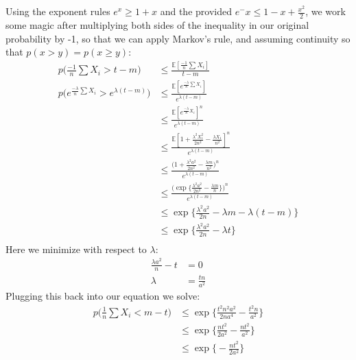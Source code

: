 \documentclass[a4paper,12pt]{article}
\begin{document}
\section{}
Using the exponent rules $e^x \geq 1 + x$ and the provided $e^-x \leq 1 - x + \frac{x^2}{2}$, we work some magic after multiplying both sides of the inequality in our original probability by -1, so that we can apply Markov's rule, and assuming continuity so that $p(x > y) = p(x \geq y)$:
\begin{align*}
p\bigg( \frac{-1}{n} \sum X_i > t - m \bigg) &\leq \frac{ \mathbb{E}[ \frac{-1}{n} \sum X_i] }{t-m} \\
p\bigg( e^{{\frac{-\lambda}{n} \sum X_i}} > e^{\lambda(t - m)} \bigg) &\leq \frac{ \mathbb{E}[ e^{\frac{-\lambda}{n} \sum X_i} ] }{e^{\lambda(t-m)}} \\
&\leq \frac{ \mathbb{E}[e^{\frac{-\lambda}{n} X_i}]^n}{e^{\lambda(t-m)}} \\
&\leq \frac{ \mathbb{E}[1 + \frac{\lambda^2X_1^2}{2n^2} - \frac{\lambda X_1}{n^2}]^n}{e^{\lambda(t-m)}} \\
&\leq \frac{ \bigg( 1 + \frac{\lambda^2a^2}{2n^2} - \frac{\lambda m}{n^2} \bigg)^n}{e^{\lambda(t-m)}} \\
&\leq \frac{ \bigg( \exp{ \bigg\{ \frac{\lambda^2a^2}{2n^2} - \frac{\lambda m}{n} \bigg\}} \bigg)^n}{e^{\lambda(t-m)}} \\
&\leq \exp{ \bigg\{ \frac{\lambda^2a^2}{2n} - \lambda m  - \lambda(t - m)\bigg\} } \\
&\leq \exp{ \bigg\{ \frac{\lambda^2a^2}{2n} - \lambda t  \bigg\} } \\
\end{align*}
Here we minimize with respect to $\lambda$:
\begin{align*}
\frac{\lambda a^2}{n} - t &= 0 \\
\lambda &= \frac{tn}{a^2}
\end{align*}
Plugging this back into our equation we solve:
\begin{align*}
p\bigg( \frac{1}{n} \sum X_i < m - t \bigg) &\leq \exp{ \bigg\{ \frac{t^2n^2a^2}{2na^4} -  \frac{t^2n}{a^2}  \bigg\} } \\
&\leq \exp{ \bigg\{ \frac{nt^2}{2a^2} -  \frac{nt^2}{a^2}  \bigg\} } \\
&\leq \exp{ \bigg\{  - \frac{nt^2}{2a^2}  \bigg\} } \\
\end{align*}
\end{document}
